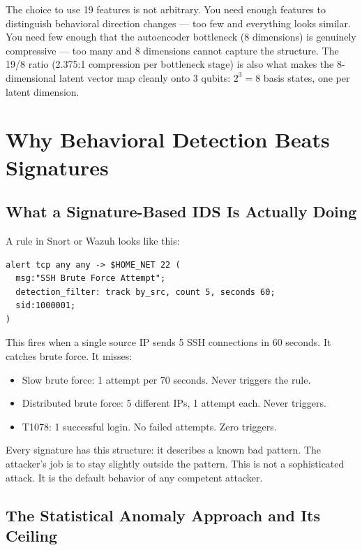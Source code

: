 \documentclass[11pt,a4paper]{article}
\begin{document}
\begin{insight}
The choice to use 19 features is not arbitrary. You need enough features to distinguish behavioral direction changes — too few and everything looks similar. You need few enough that the autoencoder bottleneck (8 dimensions) is genuinely compressive — too many and 8 dimensions cannot capture the structure. The 19/8 ratio (2.375:1 compression per bottleneck stage) is also what makes the 8-dimensional latent vector map cleanly onto 3 qubits: $2^3 = 8$ basis states, one per latent dimension.
\end{insight}

\section{Why Behavioral Detection Beats Signatures}

\subsection{What a Signature-Based IDS Is Actually Doing}

A rule in Snort or Wazuh looks like this:
\begin{lstlisting}
alert tcp any any -> $HOME_NET 22 (
  msg:"SSH Brute Force Attempt";
  detection_filter: track by_src, count 5, seconds 60;
  sid:1000001;
)
\end{lstlisting}

This fires when a single source IP sends 5 SSH connections in 60 seconds. It catches brute force. It misses:
\begin{itemize}
  \item Slow brute force: 1 attempt per 70 seconds. Never triggers the rule.
  \item Distributed brute force: 5 different IPs, 1 attempt each. Never triggers.
  \item T1078: 1 successful login. No failed attempts. Zero triggers.
\end{itemize}

Every signature has this structure: it describes a known bad pattern. The attacker's job is to stay slightly outside the pattern. This is not a sophisticated attack. It is the default behavior of any competent attacker.

\subsection{The Statistical Anomaly Approach and Its Ceiling}
\end{document}
